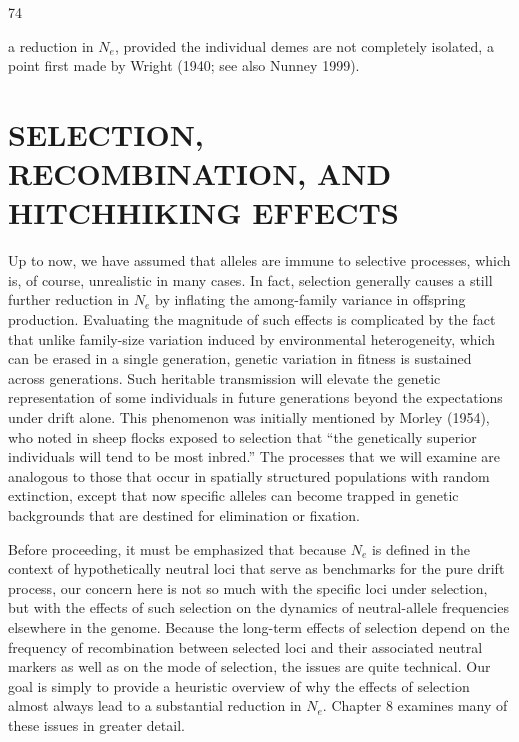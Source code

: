 \documentclass{article}
\begin{document}
74

a reduction in  $ N_{e} $, provided the individual demes are not completely isolated, a point first made by Wright (1940; see also Nunney 1999).

\section{SELECTION, RECOMBINATION, AND HITCHHIKING EFFECTS}
Up to now, we have assumed that alleles are immune to selective processes, which is, of course, unrealistic in many cases. In fact, selection generally causes a still further reduction in  $ N_{e} $ by inflating the among-family variance in offspring production. Evaluating the magnitude of such effects is complicated by the fact that unlike family-size variation induced by environmental heterogeneity, which can be erased in a single generation, genetic variation in fitness is sustained across generations. Such heritable transmission will elevate the genetic representation of some individuals in future generations beyond the expectations under drift alone. This phenomenon was initially mentioned by Morley (1954), who noted in sheep flocks exposed to selection that “the genetically superior individuals will tend to be most inbred.” The processes that we will examine are analogous to those that occur in spatially structured populations with random extinction, except that now specific alleles can become trapped in genetic backgrounds that are destined for elimination or fixation.

Before proceeding, it must be emphasized that because  $ N_{e} $ is defined in the context of hypothetically neutral loci that serve as benchmarks for the pure drift process, our concern here is not so much with the specific loci under selection, but with the effects of such selection on the dynamics of neutral-allele frequencies elsewhere in the genome. Because the long-term effects of selection depend on the frequency of recombination between selected loci and their associated neutral markers as well as on the mode of selection, the issues are quite technical. Our goal is simply to provide a heuristic overview of why the effects of selection almost always lead to a substantial reduction in  $ N_{e} $. Chapter 8 examines many of these issues in greater detail.
\end{document}
